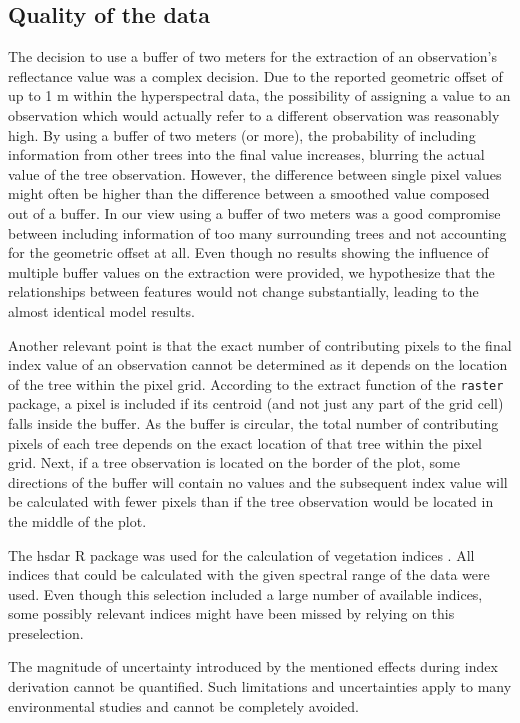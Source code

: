 \documentclass[letterpaper, peerreview, draftcls]{IEEEtran}
\begin{document}
\subsection{Quality of the data}

\noindent The decision to use a buffer of two meters for the extraction of an observation's reflectance value was a complex decision.
Due to the reported geometric offset of up to 1 m within the hyperspectral data, the possibility of assigning a value to an observation which would actually refer to a different observation was reasonably high.
By using a buffer of two meters (or more), the probability of including information from other trees into the final value increases, blurring the actual value of the tree observation.
However, the difference between single pixel values might often be higher than the difference between a smoothed value composed out of a buffer.
In our view using a buffer of two meters was a good compromise between including information of too many surrounding trees and not accounting for the geometric offset at all.
Even though no results showing the influence of multiple buffer values on the extraction were provided, we hypothesize that the relationships between features would not change substantially, leading to the almost identical model results.

Another relevant point is that the exact number of contributing pixels to the final index value of an observation cannot be determined as it depends on the location of the tree within the pixel grid.
According to the extract function of the \texttt{raster} package, a pixel is included if its centroid (and not just any part of the grid cell) falls inside the buffer.
As the buffer is circular, the total number of contributing pixels of each tree depends on the exact location of that tree within the pixel grid.
Next, if a tree observation is located on the border of the plot, some directions of the buffer will contain no values and the subsequent index value will be calculated with fewer pixels than if the tree observation would be located in the middle of the plot.

The hsdar R package was used for the calculation of vegetation indices \cite{hsdar}.
All indices that could be calculated with the given spectral range of the data were used.
Even though this selection included a large number of available indices, some possibly relevant indices might have been missed by relying on this preselection.

The magnitude of uncertainty introduced by the mentioned effects during index derivation cannot be quantified.
Such limitations and uncertainties apply to many environmental studies and cannot be completely avoided.
\end{document}
